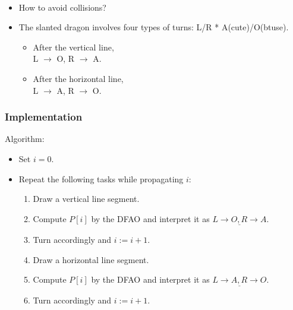 \documentclass[dvipdfmx,10pt]{beamer}
\begin{document}
{\begin{minipage}{0.4\linewidth}
{\begin{tikzpicture}
\end{tikzpicture}}
\end{minipage}
\begin{minipage}{0.05\linewidth}
\ \\
\end{minipage}
\begin{minipage}{0.5\linewidth}
\begin{itemize}
\item How to avoid collisions? \\
	\uncover<2->{\textcolor{orange}{$x$-rhombus scaling}}
\item The slanted dragon involves four types of turns: L/R * A(cute)/O(btuse). 
	\begin{itemize}
	\item After the vertical line, \\ L $\to$ O, R $\to$ A. 
	\item After the horizontal line, \\ L $\to$ A, R $\to$ O. 
	\end{itemize}
\end{itemize}
\end{minipage}

}%


\begin{frame}\frametitle{Implementation}
Algorithm: 
\begin{itemize}
\item Set $i = 0$. 
\item Repeat the following tasks while propagating $i$: 
\begin{enumerate}
\item Draw a vertical line segment.
\item Compute $P[i]$ by the DFAO and interpret it as $\underline{L \to O, R \to A}$.
\item Turn accordingly and $i := i+1$.
\item Draw a horizontal line segment.
\item Compute $P[i]$ by the DFAO and interpret it as $\underline{L \to A, R \to O}$.
\item Turn accordingly and $i := i+1$.
\end{enumerate}
\end{itemize}

\vspace*{3mm}


\end{frame}
\end{document}
